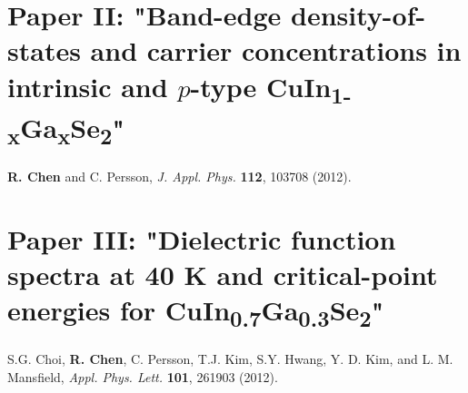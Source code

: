 \documentclass[a4paper, 12pt, titlepage,oneside,drop]{kthesis}
\begin{document}
\newpage




\section{Paper II: "Band-edge density-of-states and carrier concentrations in intrinsic and $p$-type CuIn\textsubscript{1-x}Ga\textsubscript{x}Se\textsubscript{2}"}
\textbf{R. Chen} and C. Persson, \textit{J. Appl. Phys.} {\textbf {112}}, 103708 (2012).



\newpage



\section{Paper III: "Dielectric function spectra at 40 K and critical-point energies for CuIn\textsubscript{0.7}Ga\textsubscript{0.3}Se\textsubscript{2}"}
S.G. Choi, \textbf{R. Chen}, C. Persson, T.J. Kim, S.Y. Hwang, Y. D. Kim, and L. M. Mansfield,
\textit{Appl. Phys. Lett. } {\textbf {101}}, 261903 (2012).



\newpage


\end{document}
